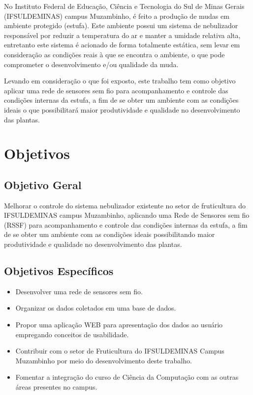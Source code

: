 No Instituto Federal de Educação, Ciência e Tecnologia do Sul de Minas Gerais (IFSULDEMINAS) campus Muzambinho, é feito a produção de mudas em ambiente protegido (estufa). Este ambiente possui um sistema de nebulizador responsável por reduzir a temperatura do ar e manter a umidade relativa alta, entretanto este sistema é acionado de forma totalmente estática, sem levar em consideração as condições reais à que se encontra o ambiente, o que pode comprometer o desenvolvimento e/ou qualidade da muda.

Levando em consideração o que foi exposto, este trabalho tem como objetivo aplicar uma rede de sensores sem fio para acompanhamento e controle das condições internas da estufa, a fim de se obter um ambiente com as condições ideais o que possibilitará maior produtividade e qualidade no desenvolvimento das plantas.

\section{Objetivos}

\subsection{Objetivo Geral}
Melhorar o controle do sistema nebulizador existente no setor de fruticultura do IFSULDEMINAS campus Muzambinho, aplicando uma Rede de Sensores sem fio (RSSF) para acompanhamento e controle das condições internas da estufa, a fim de se obter um ambiente com as condições ideais possibilitando maior produtividade e qualidade no desenvolvimento das plantas.

\subsection{Objetivos Específicos}
\begin{itemize}
    \item Desenvolver uma rede de sensores sem fio.
    \item Organizar os dados coletados em uma base de dados.
    \item Propor uma aplicação WEB para apresentação dos dados ao usuário empregando conceitos de usabilidade.
    \item Contribuir com o setor de Fruticultura do IFSULDEMINAS Campus Muzambinho por meio do desenvolvimento deste trabalho.
    \item Fomentar a integração do curso de Ciência da Computação com as outras áreas presentes no campus.
\end{itemize}

